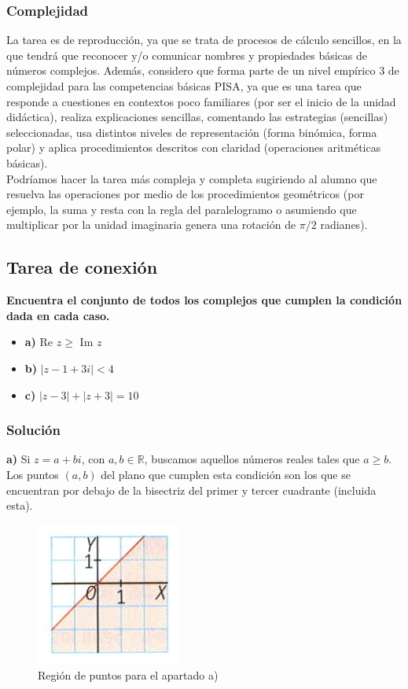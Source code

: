 \documentclass[../main.tex]{memoir}
\begin{document}
\subsubsection{Complejidad}
La tarea es de reproducción, ya que se trata de procesos de cálculo sencillos, en la que tendrá que reconocer y/o comunicar nombres y propiedades básicas de números complejos. Además, considero que forma parte de un nivel empírico 3 de complejidad para las competencias básicas PISA, ya que es una tarea que responde a cuestiones en contextos poco familiares (por ser el inicio de la unidad didáctica), realiza explicaciones sencillas, comentando las estrategias (sencillas) seleccionadas, usa distintos niveles de representación (forma binómica, forma polar) y aplica procedimientos descritos con claridad (operaciones aritméticas básicas). \\

Podríamos hacer la tarea más compleja y completa sugiriendo al alumno que resuelva las operaciones por medio de los procedimientos geométricos (por ejemplo, la suma y resta con la regla del paralelogramo o asumiendo que multiplicar por la unidad imaginaria genera una rotación de $\pi/2$ radianes).

\subsection{Tarea de conexión}

\textbf{Encuentra el conjunto de todos los complejos que cumplen la condición dada en cada caso.}

\begin{itemize}
	\item \textbf{a)} Re $z \geq$ Im $z$
	\item \textbf{b)} $|z-1+3i| < 4$
	\item \textbf{c)} $|z-3| + |z+3| = 10$
\end{itemize}

\subsubsection{Solución}

\textbf{a)} Si $z= a+bi$, con $a,b \in \mathbb{R}$, buscamos aquellos números reales tales que $a\geq b$. Los puntos $(a,b)$ del plano que cumplen esta condición son los que se encuentran por debajo de la bisectriz del primer y tercer cuadrante (incluida esta). 

\begin{figure}[H]
	\centering
	\includegraphics[scale=0.45]{images/region1.png}
	\caption{Región de puntos para el apartado a)}
	\label{region1}
\end{figure}
\end{document}
